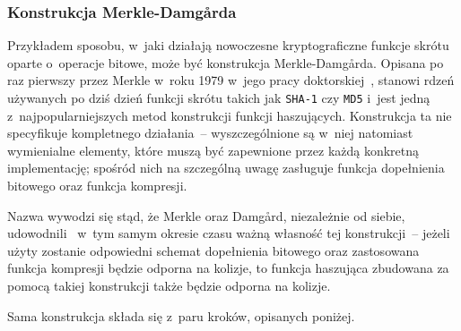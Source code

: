 \documentclass[12pt,a4paper,twoside]{article}
\begin{document}
\subsubsection{Konstrukcja Merkle-Damg\r{a}rda}
Przykładem sposobu, w~jaki działają nowoczesne kryptograficzne funkcje skrótu
oparte o~operacje bitowe, może być konstrukcja Merkle-Damg\r{a}rda. Opisana po
raz pierwszy przez Merkle w~roku 1979 w~jego pracy
doktorskiej~\cite{merkle_damgard_construction}, stanowi rdzeń używanych po dziś
dzień funkcji skrótu takich jak \texttt{SHA-1} czy \texttt{MD5} i~jest jedną
z~najpopularniejszych metod konstrukcji funkcji haszujących. Konstrukcja ta nie
specyfikuje kompletnego działania~-- wyszczególnione są w~niej natomiast
wymienialne elementy, które muszą być zapewnione przez każdą konkretną
implementację; spośród nich na szczególną uwagę zasługuje funkcja dopełnienia
bitowego oraz funkcja kompresji.

Nazwa wywodzi się stąd, że Merkle oraz Damg\r{a}rd, niezależnie od siebie,
udowodnili~\cite{merkle_damgard_security1,merkle_damgard_security2} w~tym samym
okresie czasu ważną własność tej konstrukcji~-- jeżeli użyty zostanie
odpowiedni schemat dopełnienia bitowego oraz zastosowana funkcja kompresji
będzie odporna na kolizje, to funkcja haszująca zbudowana za pomocą takiej
konstrukcji także będzie odporna na kolizje.

Sama konstrukcja składa się z~paru kroków, opisanych poniżej.
\end{document}

